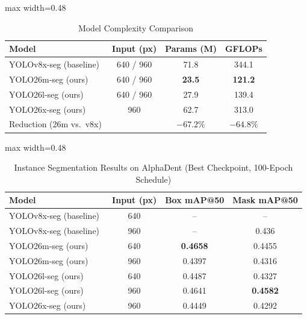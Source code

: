 \documentclass[conference]{IEEEtran}
\begin{document}
\begin{table}[htbp]
\caption{Model Complexity Comparison}
\label{tab:complexity}
\centering
\begin{adjustbox}{max width=0.48\textwidth}
\begin{tabular}{lccc}
\toprule
\textbf{Model} & \textbf{Input (px)} & \textbf{Params (M)} & \textbf{GFLOPs} \\
\midrule
YOLOv8x-seg (baseline)~\cite{jocher2023ultralytics} & 640 / 960 & 71.8 & 344.1 \\
\rowcolor{highlightColor}
YOLO26m-seg (ours) & 640 / 960 & \textbf{23.5} & \textbf{121.2} \\
\rowcolor{highlightColor}
YOLO26l-seg (ours) & 640 / 960 & 27.9 & 139.4 \\
\rowcolor{highlightColor}
YOLO26x-seg (ours) & 960 & 62.7 & 313.0 \\
\midrule
\multicolumn{2}{l}{Reduction (26m vs.\ v8x)} & $-67.2\%$ & $-64.8\%$ \\
\bottomrule
\end{tabular}
\end{adjustbox}
\end{table}

\begin{table}[htbp]
\caption{Instance Segmentation Results on AlphaDent (Best Checkpoint, 100-Epoch Schedule)}
\label{tab:results}
\centering
\begin{adjustbox}{max width=0.48\textwidth}
\begin{tabular}{lccc}
\toprule
\textbf{Model} & \textbf{Input (px)} & \textbf{Box mAP@50} & \textbf{Mask mAP@50} \\
\midrule
YOLOv8x-seg (baseline)~\cite{sosnin2025alphadent} & 640 & -- & -- \\
YOLOv8x-seg (baseline)~\cite{sosnin2025alphadent} & 960 & -- & 0.436 \\
\rowcolor{highlightColor}
YOLO26m-seg (ours) & 640 & \textbf{0.4658} & 0.4455 \\
\rowcolor{highlightColor}
YOLO26m-seg (ours) & 960 & 0.4397 & 0.4316 \\
\rowcolor{highlightColor}
YOLO26l-seg (ours) & 640 & 0.4487 & 0.4327 \\
\rowcolor{highlightColor}
YOLO26l-seg (ours) & 960 & 0.4641 & \textbf{0.4582} \\
\rowcolor{highlightColor}
YOLO26x-seg (ours) & 960 & 0.4449 & 0.4292 \\
\bottomrule
\end{tabular}
\end{adjustbox}
\end{table}
\end{document}
